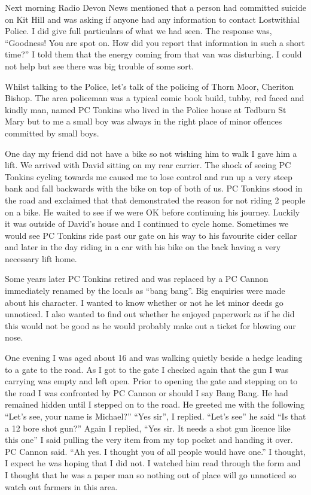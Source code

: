 Next morning Radio Devon News mentioned that a person had committed suicide on
Kit Hill and was asking if anyone had any information to contact Lostwithial
Police. I did give full particulars of what we had seen. The response was,
``Goodness! You are spot on. How did you report that information in such a
short time?'' I told them that the energy coming from that van was disturbing.
I could not help but see there was big trouble of some sort.

Whilst talking to the Police, let's talk of the policing of Thorn Moor, Cheriton
Bishop. The area policeman was a typical comic book build, tubby, red faced
and kindly man, named PC Tonkins who lived in the Police house at Tedburn St
Mary but to me a small boy was always in the right place of minor offences
committed by small boys.

One day my friend did not have a bike so not wishing him to walk I gave him a
lift. We arrived with David sitting on my rear carrier. The shock of seeing
PC Tonkins cycling towards me caused me to lose control and run up a very steep
bank and fall backwards with the bike on top of both of us. PC Tonkins stood
in the road and exclaimed that that demonstrated the reason for not riding 2
people on a bike. He waited to see if we were OK before continuing his
journey. Luckily it was outside of David's house and I continued to cycle
home. Sometimes we would see PC Tonkins ride past our gate on his way to his
favourite cider cellar and later in the day riding in a car with his bike on
the back having a very necessary lift home.

Some years later PC Tonkins retired and was replaced by a PC Cannon immediately
renamed by the locals as ``bang bang''. Big enquiries were made about his
character. I wanted to know whether or not he let minor deeds go unnoticed. I
also wanted to find out whether he enjoyed paperwork as if he did this would
not be good as he would probably make out a ticket for blowing our nose.

One evening I was aged about 16 and was walking quietly beside a hedge leading
to a gate to the road. As I got to the gate I checked again that the gun I was
carrying was empty and left open. Prior to opening the gate and stepping on to
the road I was confronted by PC Cannon or should I say Bang Bang. He had
remained hidden until I stepped on to the road. He greeted me with the
following ``Let's see, your name is Michael?'' ``Yes sir'', I replied. ``Let's
see'' he said ``Is that a 12 bore shot gun?'' Again I replied, ``Yes sir. It
needs a shot gun licence like this one'' I said pulling the very item from my
top pocket and handing it over. PC Cannon said. ``Ah yes. I thought you of
all people would have one.'' I thought, I expect he was hoping that I did not.
I watched him read through the form and I thought that he was a paper man so
nothing out of place will go unnoticed so watch out farmers in this area.

